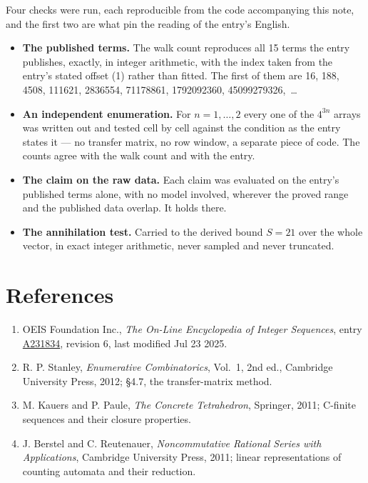 \documentclass[11pt]{article}
\theoremstyle{definition}
\begin{document}
Four checks were run, each reproducible from the code accompanying this note, and the first two are what pin the reading of the entry's English.

\begin{itemize}

\item {\bfseries The published terms.} The walk count reproduces all 15 terms the entry publishes, exactly, in integer arithmetic, with the index taken from the entry's stated offset (1) rather than fitted. The first of them are 16, 188, 4508, 111621, 2836554, 71178861, 1792092360, 45099279326,~\dots

\item {\bfseries An independent enumeration.} For $n = 1,\dots,2$ every one of the $4^{3n}$ arrays was written out and tested cell by cell against the condition as the entry states it --- no transfer matrix, no row window, a separate piece of code. The counts agree with the walk count and with the entry.

\item {\bfseries The claim on the raw data.} Each claim was evaluated on the entry's published terms alone, with no model involved, wherever the proved range and the published data overlap. It holds there.

\item {\bfseries The annihilation test.} Carried to the derived bound $S = 21$ over the whole vector, in exact integer arithmetic, never sampled and never truncated.

\end{itemize}

\section{References}

\begin{enumerate}

\item OEIS Foundation Inc., \emph{The On-Line Encyclopedia of Integer Sequences}, entry \href{https://oeis.org/A231834}{A231834}, revision 6, last modified Jul 23 2025.

\item R. P. Stanley, \emph{Enumerative Combinatorics}, Vol.~1, 2nd ed., Cambridge University Press, 2012; \S4.7, the transfer-matrix method.

\item M. Kauers and P. Paule, \emph{The Concrete Tetrahedron}, Springer, 2011; C-finite sequences and their closure properties.

\item J. Berstel and C. Reutenauer, \emph{Noncommutative Rational Series with Applications}, Cambridge University Press, 2011; linear representations of counting automata and their reduction.

\end{enumerate}
\end{document}
